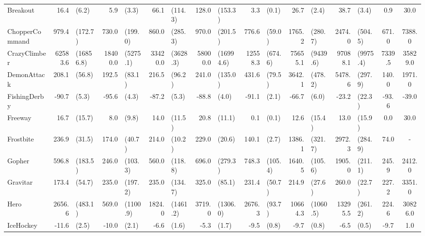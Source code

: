 \begin{landscape}
\begin{changemargin}{0cm}{0cm}
\begin{center}
\begin{table}[!htbp]
\begin{tabular}{lrlrlrlrlrlrlrlcc}
Breakout       &     16.4 &      (6.2) &      5.9 &     (3.3) &       66.1 &      (114.3) &    128.0 &    (153.3) &      3.3 &    (0.1) &     26.7 &      (2.4) &      38.7 &      (3.4) &      0.9 &     30.0 \\
ChopperCommand &    979.4 &    (172.7) &    730.0 &   (199.0) &      860.0 &      (285.3) &    970.0 &    (201.5) &    776.6 &   (59.0) &   1765.2 &    (280.7) &    2474.0 &    (504.5) &    671.0 &   7388.0 \\
CrazyClimber   &  62583.6 &  (16856.8) &  18400.0 &  (5275.1) &    33420.0 &     (3628.3) &  58000.0 &  (16994.6) &  12558.3 &  (674.6) &  75655.1 &   (9439.6) &   97088.1 &   (9975.4) &   7339.5 &  35829.0 \\
DemonAttack    &    208.1 &     (56.8) &    192.5 &    (83.1) &      216.5 &       (96.2) &    241.0 &    (135.0) &    431.6 &   (79.5) &   3642.1 &    (478.2) &    5478.6 &    (297.9) &    140.0 &   1971.0 \\
FishingDerby   &    -90.7 &      (5.3) &    -95.6 &     (4.3) &      -87.2 &        (5.3) &    -88.8 &      (4.0) &    -91.1 &    (2.1) &    -66.7 &      (6.0) &     -23.2 &     (22.3) &    -93.6 &    -39.0 \\
Freeway        &     16.7 &     (15.7) &      8.0 &     (9.8) &       14.0 &       (11.5) &     20.8 &     (11.1) &      0.1 &    (0.1) &     12.6 &     (15.4) &      13.0 &     (15.9) &      0.0 &     30.0 \\
Frostbite      &    236.9 &     (31.5) &    174.0 &    (40.7) &      214.0 &       (10.2) &    229.0 &     (20.6) &    140.1 &    (2.7) &   1386.1 &    (321.7) &    2972.3 &    (284.9) &     74.0 &      - \\
Gopher         &    596.8 &    (183.5) &    246.0 &   (103.3) &      560.0 &      (118.8) &    696.0 &    (279.3) &    748.3 &  (105.4) &   1640.5 &    (105.6) &    1905.0 &    (211.1) &    245.9 &   2412.0 \\
Gravitar       &    173.4 &     (54.7) &    235.0 &   (197.2) &      235.0 &      (134.7) &    325.0 &     (85.1) &    231.4 &   (50.7) &    214.9 &     (27.6) &     260.0 &     (22.7) &    227.2 &   3351.0 \\
Hero           &   2656.6 &    (483.1) &    569.0 &  (1100.9) &     1824.0 &     (1461.2) &   3719.0 &   (1306.0) &   2676.3 &   (93.7) &  10664.3 &   (1060.5) &   13295.5 &    (261.2) &    224.6 &  30826.0 \\
IceHockey      &    -11.6 &      (2.5) &    -10.0 &     (2.1) &       -6.6 &        (1.6) &     -5.3 &      (1.7) &     -9.5 &    (0.8) &     -9.7 &      (0.8) &      -6.5 &      (0.5) &     -9.7 &      1.0 \\

\end{tabular}
\end{table}
\end{center}
\end{changemargin}
\end{landscape}
